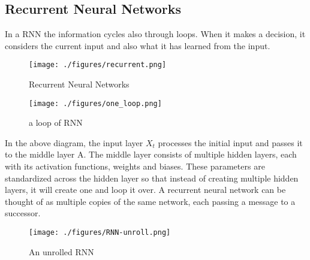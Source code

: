


\subsection{Recurrent Neural Networks}
In a RNN the information cycles also through loops. When it makes a decision, it considers the current input and also what it has learned from the input.
\begin{figure}[h]
	\centering
	\texttt{[image: ./figures/recurrent.png]}	
	\caption{Recurrent Neural Networks}
\end{figure}

\begin{figure}[h]
	\centering
	\texttt{[image: ./figures/one\_loop.png]}	
	\caption{a loop of RNN}
\end{figure}

In the above diagram, the input layer $X_t$ processes the initial input and passes it to the middle layer A. The middle layer consists of multiple hidden layers, each with its activation functions, weights and biases. These parameters are standardized across the hidden layer so that instead of creating multiple hidden layers, it will create one and loop it over. A recurrent neural network can be thought of as multiple copies of the same network, each passing a message to a successor.
\begin{figure}[h]
	\centering
	\texttt{[image: ./figures/RNN-unroll.png]}
	\caption{An unrolled RNN}
\end{figure}

